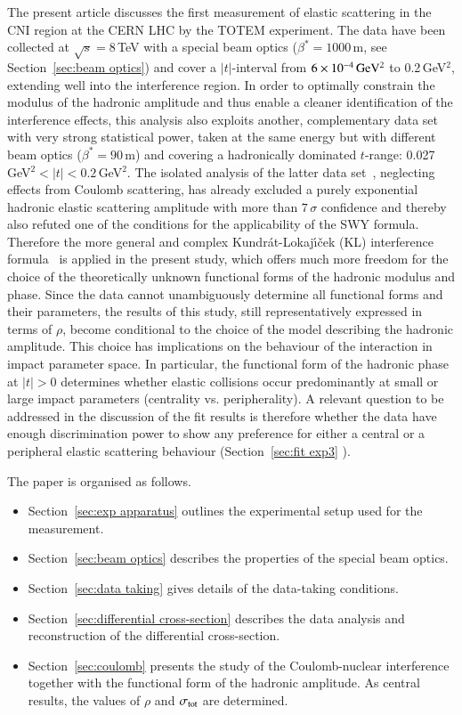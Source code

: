 The present article discusses the first measurement of elastic scattering in the
CNI region at the CERN LHC by the TOTEM experiment. 
The data have been collected at $\sqrt{s} = 8\,$TeV with a special beam optics 
($\beta^{*}=1000\,$m, see Section~\ref{sec:beam optics}) and cover a $|t|$-interval from $6\times10^{-4}\,\rm GeV^{2}$ to 0.2\,GeV$^{2}$, extending well into 
the interference region. 
In order to optimally constrain the modulus of the hadronic amplitude and thus enable a cleaner identification of the interference effects, 
this analysis also exploits another, complementary data set with very strong statistical power, taken at the same energy but with different beam optics ($\beta^{*}=90\,$m) and covering a hadronically dominated $t$-range: 0.027\,GeV$^{2} < |t| < 0.2\,$GeV$^{2}$. The isolated analysis of the
latter data set~\cite{8tev-90m}, neglecting effects from Coulomb scattering, has already excluded a purely exponential hadronic elastic scattering
amplitude with more than $7\,\sigma$ confidence and thereby also refuted
one of the conditions for the applicability of the SWY formula.
Therefore the more general and complex Kundr\'{a}t-Lokaj\'{\i}\v{c}ek (KL) interference 
formula~\cite{kl94} is applied in the present study, which offers much more freedom for the
choice of the theoretically unknown functional forms of the hadronic modulus 
and phase. Since the data cannot unambiguously determine all functional forms and their parameters, the results of this study, still representatively 
expressed in terms of $\rho$, become conditional to the choice of the model 
describing the hadronic amplitude. This choice has implications on the behaviour of the interaction in impact parameter space. In particular, the functional 
form of the hadronic phase at $|t|>0$ determines whether elastic collisions occur predominantly at small or large impact parameters (centrality vs. peripherality). A relevant question to be addressed in the discussion of the fit results is therefore whether the data have enough discrimination power to show any preference for either a central or a peripheral elastic scattering behaviour (Section~\ref{sec:fit exp3} ).

The paper is organised as follows.
\begin{itemize}
\item Section~\ref{sec:exp apparatus} outlines the experimental setup used for the measurement.
\item Section~\ref{sec:beam optics} describes the properties of the special beam optics.
\item Section~\ref{sec:data taking} gives details of the data-taking conditions.
\item Section~\ref{sec:differential cross-section} describes the data analysis and reconstruction of the differential cross-section.
\item Section~\ref{sec:coulomb} presents the study of the Coulomb-nuclear interference together with the functional form of the hadronic amplitude. As central
results, the values of $\rho$ and $\sigma_{\rm tot}$ are determined.
\end{itemize}

